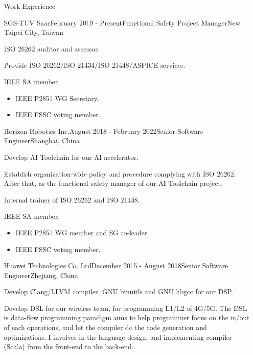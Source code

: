\documentclass{resume} %
\begin{document}
\begin{rSection}{Work Experience}

\begin{rSubsection}{SGS-TUV Saar}{February 2019 - Present}{Functional Safety Project Manager}{New Taipei City, Taiwan}
\item ISO 26262 auditor and assessor.
\item Provide ISO 26262/ISO 21434/ISO 21448/ASPICE services.
\item IEEE SA member.
\begin{itemize}
\item IEEE P2851 WG Secretary.
\item IEEE FSSC voting member.
\end{itemize}
\end{rSubsection}

\begin{rSubsection}{Horizon Robotics Inc.}{August 2018 - February 2022}{Senior Software Engineer}{Shanghai, China}
\item Develop AI Toolchain for our AI accelerator.
\item Establish organization-wide policy and procedure complying with ISO 26262. After that, as the functional safety manager of our AI Toolchain project.
\item Internal trainer of ISO 26262 and ISO 21448.
\item IEEE SA member.
\begin{itemize}
\item IEEE P2851 WG member and SG co-leader.
\item IEEE FSSC voting member.
\end{itemize}
\end{rSubsection}


\begin{rSubsection}{Huawei Technologies Co. Ltd}{December 2015 - August 2018}{Senior Software Engineer}{Zhejiang, China}
\item Develop Clang/LLVM compiler, GNU binutils and GNU libgcc for our DSP.
\item Develop DSL for our wireless team, for programming L1/L2 of 4G/5G. The DSL is data-flow programming paradigm aims to help programmer focus on the in/out of each operations, and let the compiler do the code generation and optimizations. I involves in the language design, and implementing compiler (Scala) from the front-end to the back-end.
\end{rSubsection}


\end{rSection}
\end{document}
